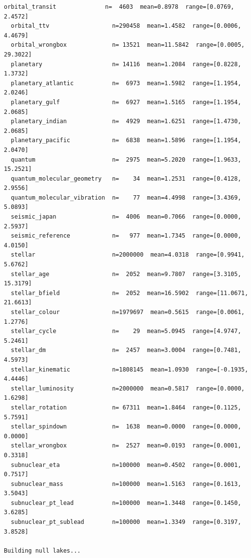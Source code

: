 \documentclass[11pt, letterpaper, openany]{book}
\begin{document}
\begin{empiricalbox}
\begin{lstlisting}[style=terminal]
  orbital_transit              n=  4603  mean=0.8978  range=[0.0769, 2.4572]
  orbital_ttv                  n=290458  mean=1.4582  range=[0.0006, 4.4679]
  orbital_wrongbox             n= 13521  mean=11.5842  range=[0.0005, 29.3022]
  planetary                    n= 14116  mean=1.2084  range=[0.8228, 1.3732]
  planetary_atlantic           n=  6973  mean=1.5982  range=[1.1954, 2.0246]
  planetary_gulf               n=  6927  mean=1.5165  range=[1.1954, 2.0685]
  planetary_indian             n=  4929  mean=1.6251  range=[1.4730, 2.0685]
  planetary_pacific            n=  6838  mean=1.5896  range=[1.1954, 2.0470]
  quantum                      n=  2975  mean=5.2020  range=[1.9633, 15.2521]
  quantum_molecular_geometry   n=    34  mean=1.2531  range=[0.4128, 2.9556]
  quantum_molecular_vibration  n=    77  mean=4.4998  range=[3.4369, 5.0893]
  seismic_japan                n=  4006  mean=0.7066  range=[0.0000, 2.5937]
  seismic_reference            n=   977  mean=1.7345  range=[0.0000, 4.0150]
  stellar                      n=2000000  mean=4.0318  range=[0.9941, 5.6762]
  stellar_age                  n=  2052  mean=9.7807  range=[3.3105, 15.3179]
  stellar_bfield               n=  2052  mean=16.5902  range=[11.0671, 21.6613]
  stellar_colour               n=1979697  mean=0.5615  range=[0.0061, 1.2776]
  stellar_cycle                n=    29  mean=5.0945  range=[4.9747, 5.2461]
  stellar_dm                   n=  2457  mean=3.0004  range=[0.7481, 4.5973]
  stellar_kinematic            n=1808145  mean=1.0930  range=[-0.1935, 4.4446]
  stellar_luminosity           n=2000000  mean=0.5817  range=[0.0000, 1.6298]
  stellar_rotation             n= 67311  mean=1.8464  range=[0.1125, 5.7591]
  stellar_spindown             n=  1638  mean=0.0000  range=[0.0000, 0.0000]
  stellar_wrongbox             n=  2527  mean=0.0193  range=[0.0001, 0.3318]
  subnuclear_eta               n=100000  mean=0.4502  range=[0.0001, 0.7517]
  subnuclear_mass              n=100000  mean=1.5163  range=[0.1613, 3.5043]
  subnuclear_pt_lead           n=100000  mean=1.3448  range=[0.1450, 3.6285]
  subnuclear_pt_sublead        n=100000  mean=1.3349  range=[0.3197, 3.8528]

Building null lakes...


\end{lstlisting}
\end{empiricalbox}
\end{document}

